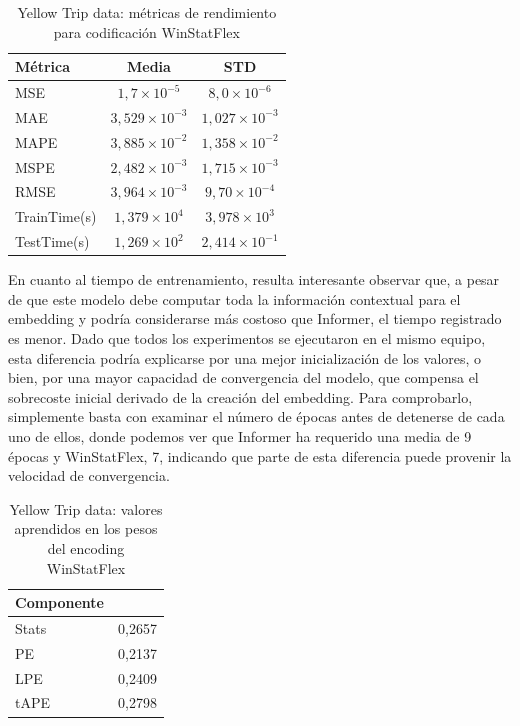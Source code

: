 \begin{table}[!ht]
	\centering
	\begin{tabular}{l|c|c}
		\toprule
		Métrica & Media & STD \\
		\midrule
		MSE & $1,7 \times 10^{-5}$ & $8,0 \times 10^{-6}$ \\
		MAE & $3,529 \times 10^{-3}$ & $1,027 \times 10^{-3}$ \\
		MAPE & $3,885 \times 10^{-2}$ & $1,358 \times 10^{-2}$ \\
		MSPE & $2,482 \times 10^{-3}$ & $1,715 \times 10^{-3}$ \\
		RMSE & $3,964 \times 10^{-3}$ & $9,70 \times 10^{-4}$ \\
		TrainTime(s) & $1,379 \times 10^{4}$ & $3,978 \times 10^{3}$ \\
		TestTime(s) & $1,269 \times 10^{2}$ & $2,414 \times 10^{-1}$ \\
		\bottomrule
	\end{tabular}
	\caption{Yellow Trip data: métricas de rendimiento para codificación WinStatFlex}
	\label{taxiflex}
\end{table}

En cuanto al tiempo de entrenamiento, resulta interesante observar que, a pesar de que este modelo debe computar toda la información contextual para el embedding y podría considerarse más costoso que Informer, el tiempo registrado es menor. Dado que todos los experimentos se ejecutaron en el mismo equipo, esta diferencia podría explicarse por una mejor inicialización de los valores, o bien, por una mayor capacidad de convergencia del modelo, que compensa el sobrecoste inicial derivado de la creación del embedding. Para comprobarlo, simplemente basta con examinar el número de épocas antes de detenerse de cada uno de ellos, donde podemos ver que Informer ha requerido una media de 9 épocas y WinStatFlex, 7, indicando que parte de esta diferencia puede provenir la velocidad de convergencia. 

\begin{table}[!ht]
	\centering
	\begin{tabular}{l|N}
	\toprule
	Componente &  \\
	\midrule
	Stats & 0,2657 \\
	PE & 0,2137 \\
	LPE & 0,2409 \\
	tAPE & 0,2798 \\
	\bottomrule
\end{tabular}
	\caption{Yellow Trip data: valores aprendidos en los pesos del encoding WinStatFlex}
\label{taxiflexpesos}
\end{table}

